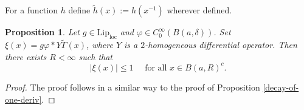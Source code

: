 \documentclass[12pt,a4paper,reqno]{amsart}
\DeclareMathOperator{\supp}{supp}
\newcommand{\wt}{\widetilde}
\newcommand{\cg}{\Gamma}
\newcommand{\G}{\mathbb{G}}
\numberwithin{equation}{section}
\newtheorem{prop}[thm]{Proposition}
\theoremstyle{definition}
\begin{document}
For a function $h$ define $\wt{h}(x):= h(x^{-1})$ wherever defined.

\begin{prop}\label{decay-of-two-derivs}
Let $g\in \text{Lip}_{\text{loc}}$ and $\varphi \in C_0^{\infty}(B(a,\delta))$. Set $\xi(x) = g \varphi \ast Y\wt{\cg}(x)$, where $Y$ is a $2$-homogeneous differential operator. Then there exists $R < \infty$ such that $$|\xi(x)| \leq 1 \quad \text{ for all }x\in B(a,R)^c.$$
\end{prop}
\begin{proof}
The proof follows in a similar way to the proof of Proposition \ref{decay-of-one-deriv}.
\end{proof}
\end{document}
